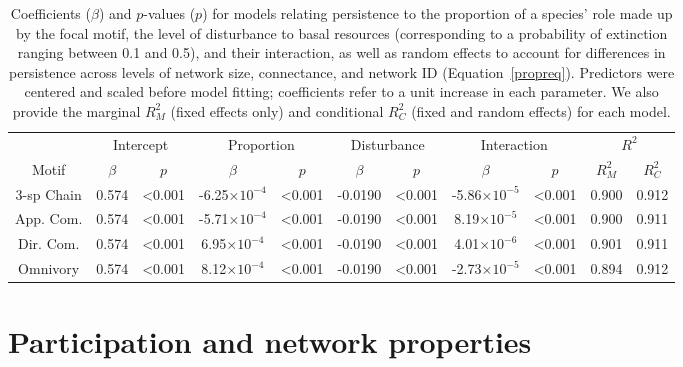 \documentclass[12pt]{article}
\begin{document}
\begin{spacing}{2.0}
    \begin{table}[ht!]
        \centering
        \caption{Coefficients ($\beta$) and $p$-values ($p$) for models relating persistence to the proportion of a species' role made up by the focal motif, the level of disturbance to basal resources (corresponding to a probability of extinction ranging between 0.1 and 0.5), and their interaction, as well as random effects to account for differences in persistence across levels of network size, connectance, and network ID  (Equation~\ref{propreq}). Predictors were centered and scaled before model fitting; coefficients refer to a unit increase in each parameter. We also provide the marginal $R^2_M$ (fixed effects only) and conditional $R^2_C$ (fixed and random effects) for each model.}
        \label{tab:proportion}                \footnotesize
        \begin{tabular}{c|c c | c c | c c | c c | c c }
        & \multicolumn{2}{c|}{Intercept} & \multicolumn{2}{c|}{Proportion} & \multicolumn{2}{c|}{Disturbance} & \multicolumn{2}{c|}{Interaction} & \multicolumn{2}{c}{$R^2$} \\
        Motif & $\beta$ & $p$ & $\beta$ & $p$ & $\beta$ & $p$ & $\beta$ & $p$ & $R^2_M$ & $R^2_C$ \\
        \hline
        3-sp Chain & 0.574 & \textless0.001 & -6.25$\times10^{-4}$ & \textless0.001 & -0.0190 & \textless0.001 & -5.86$\times10^{-5}$& \textless0.001 & 0.900 & 0.912 \\
        App. Com. & 0.574 & \textless0.001 & -5.71$\times10^{-4}$ & \textless0.001 & -0.0190 & \textless0.001 & 8.19$\times10^{-5}$ & \textless0.001 & 0.900 & 0.911 \\
        Dir. Com. & 0.574 & \textless0.001 & 6.95$\times10^{-4}$ & \textless0.001 & -0.0190 & \textless0.001 & 4.01$\times10^{-6}$ & \textless0.001 & 0.901 & 0.911 \\
        Omnivory & 0.574 & \textless0.001 & 8.12$\times10^{-4}$ & \textless0.001 & -0.0190 & \textless0.001 & -2.73$\times10^{-5}$ & \textless0.001 & 0.894 & 0.912 \\
        \end{tabular}
    \end{table}        
\clearpage     

\section{Participation and network properties}



\end{spacing}
\end{document}
